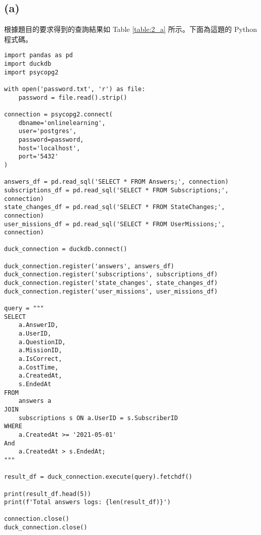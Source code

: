 \documentclass{article}
\begin{document}
\subsection*{(a)}
根據題目的要求得到的查詢結果如 Table \ref{table:2_a} 所示。下面為這題的 Python 程式碼。
\begin{verbatim}
import pandas as pd
import duckdb
import psycopg2

with open('password.txt', 'r') as file:
    password = file.read().strip()  

connection = psycopg2.connect(
    dbname='onlinelearning',
    user='postgres',  
    password=password,  
    host='localhost',
    port='5432'
)

answers_df = pd.read_sql('SELECT * FROM Answers;', connection)
subscriptions_df = pd.read_sql('SELECT * FROM Subscriptions;', connection)
state_changes_df = pd.read_sql('SELECT * FROM StateChanges;', connection)
user_missions_df = pd.read_sql('SELECT * FROM UserMissions;', connection)

duck_connection = duckdb.connect()

duck_connection.register('answers', answers_df)
duck_connection.register('subscriptions', subscriptions_df)
duck_connection.register('state_changes', state_changes_df)
duck_connection.register('user_missions', user_missions_df)

query = """
SELECT 
    a.AnswerID, 
    a.UserID, 
    a.QuestionID, 
    a.MissionID, 
    a.IsCorrect, 
    a.CostTime, 
    a.CreatedAt, 
    s.EndedAt 
FROM 
    answers a
JOIN 
    subscriptions s ON a.UserID = s.SubscriberID 
WHERE
    a.CreatedAt >= '2021-05-01'
And
    a.CreatedAt > s.EndedAt;
"""

result_df = duck_connection.execute(query).fetchdf()

print(result_df.head(5))
print(f'Total answers logs: {len(result_df)}')

connection.close()
duck_connection.close()
\end{verbatim}

\begin{table}[H]
\centering
{}
\caption{First Five Answer Logs After Subscription End Date}
\label{table:2_a}
\end{table}
\end{document}
